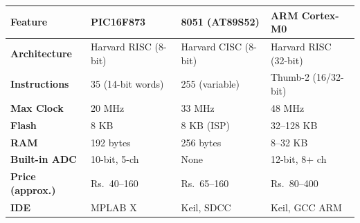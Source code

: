 \documentclass[12pt,a4paper]{article}
\renewcommand{\arraystretch}{1.45}
\begin{document}
\begin{tcolorbox}[tikzbox, title={PIC16F873 vs.\ 8051 vs.\ ARM Cortex-M0 --- Comparison}]
\par\noindent
{\renewcommand{\arraystretch}{1.55}%
\begin{tabularx}{\linewidth}{|B{2.5cm}|Y|Y|Y|}
\hline
\textbf{Feature} & \textbf{PIC16F873} & \textbf{8051 (AT89S52)} & \textbf{ARM Cortex-M0} \\
\hline
\textbf{Architecture} & Harvard RISC (8-bit) & Harvard CISC (8-bit) & Harvard RISC (32-bit) \\
\hline
\textbf{Instructions} & 35 (14-bit words) & 255 (variable) & Thumb-2 (16/32-bit) \\
\hline
\textbf{Max Clock} & 20 MHz & 33 MHz & 48 MHz \\
\hline
\textbf{Flash} & 8 KB & 8 KB (ISP) & 32--128 KB \\
\hline
\textbf{RAM} & 192 bytes & 256 bytes & 8--32 KB \\
\hline
\textbf{Built-in ADC} & 10-bit, 5-ch & None & 12-bit, 8+ ch \\
\hline
\textbf{Price (approx.)} & Rs.~40--160 & Rs.~65--160 & Rs.~80--400 \\
\hline
\textbf{IDE} & MPLAB X & Keil, SDCC & Keil, GCC ARM \\
\hline
\end{tabularx}}
\end{tcolorbox}
\end{document}
